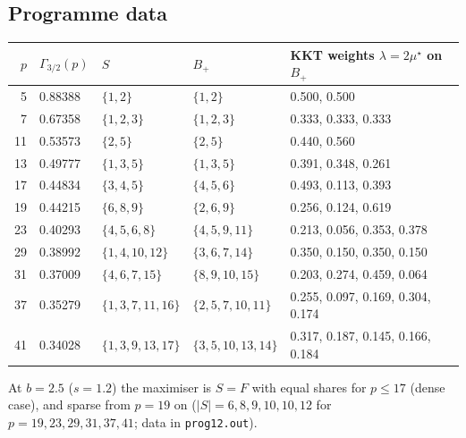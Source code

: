 \documentclass[11pt]{article}
\theoremstyle{definition}
\begin{document}
\subsection{Programme data}
\begin{center}\small
\begin{tabular}{rllll}
\toprule
$p$ & $\Gamma_{3/2}(p)$ & $S$ & $B_+$ & KKT weights $\lambda=2\mu^\star$ on $B_+$\\
\midrule
5 & 0.88388 & $\{1,2\}$ & $\{1,2\}$ & 0.500, 0.500\\
7 & 0.67358 & $\{1,2,3\}$ & $\{1,2,3\}$ & 0.333, 0.333, 0.333\\
11 & 0.53573 & $\{2,5\}$ & $\{2,5\}$ & 0.440, 0.560\\
13 & 0.49777 & $\{1,3,5\}$ & $\{1,3,5\}$ & 0.391, 0.348, 0.261\\
17 & 0.44834 & $\{3,4,5\}$ & $\{4,5,6\}$ & 0.493, 0.113, 0.393\\
19 & 0.44215 & $\{6,8,9\}$ & $\{2,6,9\}$ & 0.256, 0.124, 0.619\\
23 & 0.40293 & $\{4,5,6,8\}$ & $\{4,5,9,11\}$ & 0.213, 0.056, 0.353, 0.378\\
29 & 0.38992 & $\{1,4,10,12\}$ & $\{3,6,7,14\}$ & 0.350, 0.150, 0.350, 0.150\\
31 & 0.37009 & $\{4,6,7,15\}$ & $\{8,9,10,15\}$ & 0.203, 0.274, 0.459, 0.064\\
37 & 0.35279 & $\{1,3,7,11,16\}$ & $\{2,5,7,10,11\}$ & 0.255, 0.097, 0.169, 0.304, 0.174\\
41 & 0.34028 & $\{1,3,9,13,17\}$ & $\{3,5,10,13,14\}$ & 0.317, 0.187, 0.145, 0.166, 0.184\\
\bottomrule
\end{tabular}
\end{center}
At $b=2.5$ ($s=1.2$) the maximiser is $S=F$ with equal shares for $p\le17$ (dense case), and sparse from $p=19$ on
($|S|=6,8,9,10,10,12$ for $p=19,23,29,31,37,41$; data in \texttt{prog12.out}).
\end{document}
